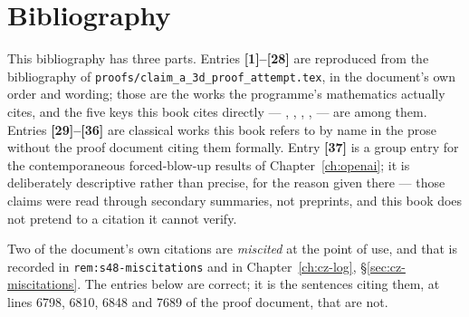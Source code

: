 \chapter*{Bibliography}

\noindent
\small
This bibliography has three parts. Entries \textbf{[1]--[28]} are reproduced
from the bibliography of \texttt{proofs/claim\_a\_3d\_proof\_attempt.tex}, in
the document's own order and wording; those are the works the programme's
mathematics actually cites, and the five keys this book cites directly ---
\cite{KNSS2009}, \cite{SereginSverak2009}, \cite{Seregin2012},
\cite{LadyzhenskayaSeregin1999}, \cite{AlbrittonBarker2019} --- are among
them. Entries \textbf{[29]--[36]} are classical works this book refers to by
name in the prose without the proof document citing them formally. Entry
\textbf{[37]} is a group entry for the contemporaneous forced-blow-up results
of Chapter~\ref{ch:openai}; it is deliberately descriptive rather than
precise, for the reason given there --- those claims were read through
secondary summaries, not preprints, and this book does not pretend to a
citation it cannot verify.

\medskip
\noindent
Two of the document's own citations are \emph{miscited} at the point of use,
and that is recorded in \texttt{rem:s48-miscitations} and in
Chapter~\ref{ch:cz-log}, \S\ref{sec:cz-miscitations}. The entries below are
correct; it is the sentences citing them, at lines 6798, 6810, 6848 and 7689
of the proof document, that are not.

